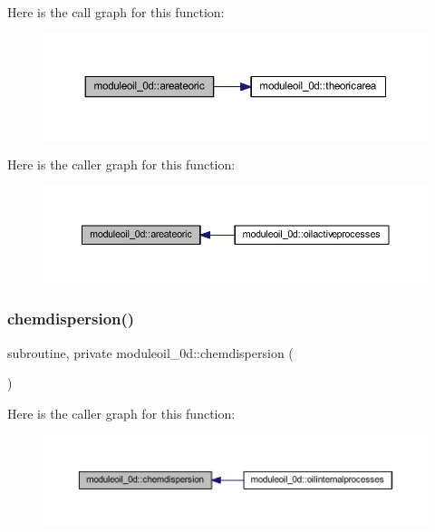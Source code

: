 Here is the call graph for this function\+:\nopagebreak
\begin{figure}[H]
\begin{center}
\leavevmode
\includegraphics[width=350pt]{namespacemoduleoil__0d_ae124c13fd1eb9319a89b0b5eb325d0be_cgraph}
\end{center}
\end{figure}
Here is the caller graph for this function\+:\nopagebreak
\begin{figure}[H]
\begin{center}
\leavevmode
\includegraphics[width=350pt]{namespacemoduleoil__0d_ae124c13fd1eb9319a89b0b5eb325d0be_icgraph}
\end{center}
\end{figure}
\mbox{\label{namespacemoduleoil__0d_a0572ecc4d1cd6504abb835636eeb8f26}} 
\subsubsection{\texorpdfstring{chemdispersion()}{chemdispersion()}}
{\footnotesize\ttfamily subroutine, private moduleoil\+\_\+0d\+::chemdispersion (\begin{DoxyParamCaption}{ }\end{DoxyParamCaption})\hspace{0.3cm}{\ttfamily [private]}}

Here is the caller graph for this function\+:\nopagebreak
\begin{figure}[H]
\begin{center}
\leavevmode
\includegraphics[width=350pt]{namespacemoduleoil__0d_a0572ecc4d1cd6504abb835636eeb8f26_icgraph}
\end{center}
\end{figure}
\mbox{\label{namespacemoduleoil__0d_af21b7b35e50b7197438d5bfc61cb5ac4}} 
